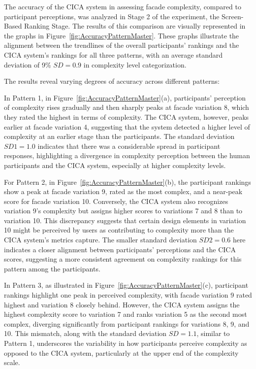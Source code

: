 The accuracy of the CICA system in assessing facade complexity, compared to participant perceptions, was analyzed in Stage 2 of the experiment, the Screen-Based Ranking Stage.
The results of this comparison are visually represented in the graphs in Figure~\ref{fig:AccuracyPatternMaster}.
These graphs illustrate the alignment between the trendlines of the overall participants' rankings and the CICA system's rankings for all three patterns, with an average standard deviation of 9\% \(SD = 0.9\) in complexity level categorization.

The results reveal varying degrees of accuracy across different patterns:

In Pattern 1, in Figure~\ref{fig:AccuracyPatternMaster}(a), participants' perception of complexity rises gradually and then sharply peaks at facade variation 8, which they rated the highest in terms of complexity.
The CICA system, however, peaks earlier at facade variation 4, suggesting that the system detected a higher level of complexity at an earlier stage than the participants.
The standard deviation \(SD1 = 1.0\) indicates that there was a considerable spread in participant responses, highlighting a divergence in complexity perception between the human participants and the CICA system, especially at higher complexity levels.

For Pattern 2, in Figure~\ref{fig:AccuracyPatternMaster}(b), the participant rankings show a peak at facade variation 9, rated as the most complex, and a near-peak score for facade variation 10.
Conversely, the CICA system also recognizes variation 9's complexity but assigns higher scores to variations 7 and 8 than to variation 10.
This discrepancy suggests that certain design elements in variation 10 might be perceived by users as contributing to complexity more than the CICA system's metrics capture.
The smaller standard deviation \(SD2 = 0.6\) here indicates a closer alignment between participants’ perceptions and the CICA scores, suggesting a more consistent agreement on complexity rankings for this pattern among the participants.

In Pattern 3, as illustrated in Figure~\ref{fig:AccuracyPatternMaster}(c), participant rankings highlight one peak in perceived complexity, with facade variation 9 rated highest and variation 8 closely behind.
However, the CICA system assigns the highest complexity score to variation 7 and ranks variation 5 as the second most complex, diverging significantly from participant rankings for variations 8, 9, and 10.
This mismatch, along with the standard deviation \(SD = 1.1\), similar to Pattern 1, underscores the variability in how participants perceive complexity as opposed to the CICA system, particularly at the upper end of the complexity scale.

